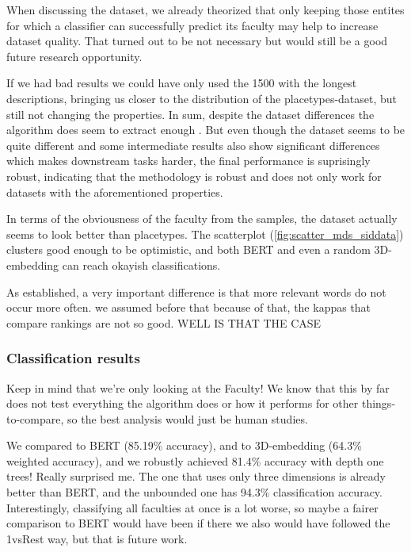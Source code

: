 When discussing the dataset, we already theorized that only keeping those entites for which a classifier can successfully predict its faculty may help to increase dataset quality. That turned out to be not necessary but would still be a good future research opportunity.

If we had bad results we could have only used the 1500 with the longest descriptions, bringing us closer to the distribution of the placetypes-dataset, but still not changing the properties. In sum, despite the dataset differences the algorithm does seem to extract enough . But even though the dataset seems to be quite different and some intermediate results also show significant differences which makes downstream tasks harder, the final performance is suprisingly robust, indicating that the methodology is robust and does not only work for datasets with the aforementioned properties. 

In terms of the obviousness of the faculty from the samples, the dataset actually seems to look better than placetypes. The scatterplot (\autoref{fig:scatter_mds_siddata}) clusters good enough to be optimistic, and both BERT and even a random 3D-embedding can reach okayish classifications.

As established, a very important difference is that more relevant words do not occur more often. we assumed before that because of that, the kappas that compare rankings are not so good. WELL IS THAT THE CASE

\subsubsection{Classification results}

Keep in mind that we're only looking at the Faculty! We know that this by far does not test everything the algorithm does or how it performs for other things-to-compare, so the best analysis would just be human studies.

We compared to BERT (85.19\% accuracy), and to 3D-embedding (64.3\% weighted accuracy), and we robustly achieved 81.4\% accuracy with depth one trees! Really surprised me. The one that uses only three dimensions is already better than BERT, and the unbounded one has 94.3\% classification accuracy. Interestingly, classifying all faculties at once is a lot worse, so maybe a fairer comparison to BERT would have been if there we also would have followed the 1vsRest way, but that is future work.

